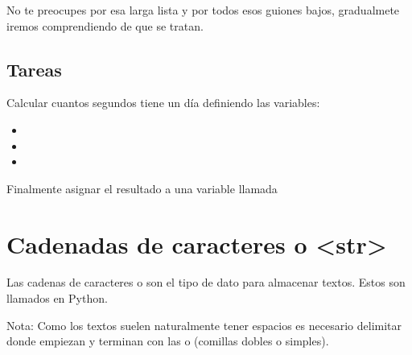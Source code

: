 \documentclass[a5paper,9pt,spanish]{sphinxmanual}
\begin{document}
\sphinxAtStartPar
No te preocupes por esa larga lista y por todos esos guiones bajos,
gradualmete iremos comprendiendo de que se tratan.


\section{Tareas}
\label{\detokenize{int:tareas}}
\sphinxAtStartPar
Calcular cuantos segundos tiene un día definiendo las variables:
\begin{itemize}
\item {} 
\sphinxAtStartPar
{}

\item {} 
\sphinxAtStartPar
{}

\item {} 
\sphinxAtStartPar
{}

\end{itemize}

\sphinxAtStartPar
Finalmente asignar el resultado a una variable llamada 

\sphinxstepscope


\chapter{Cadenadas de caracteres o  \textless{}str\textgreater{}}
\label{\detokenize{str:cadenadas-de-caracteres-o-strings-str}}\label{\detokenize{str::doc}}
\sphinxAtStartPar
Las cadenas de caracteres o  son el tipo de dato para almacenar textos.
Estos son llamados  en Python.

\begin{sphinxVerbatim}[commandchars=\\\{\}]
  
 
\end{sphinxVerbatim}

\sphinxAtStartPar
Nota: Como los textos suelen naturalmente tener espacios es necesario
delimitar donde empiezan y terminan con las  o \sphinxcode{\sphinxupquote{\textquotesingle{}}} (comillas
dobles o simples).
\end{document}
